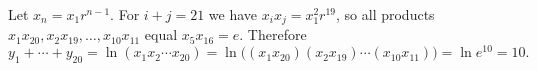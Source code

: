 Let $x_n=x_1r^{n-1}$. For $i+j=21$ we have $x_ix_j=x_1^2r^{19}$, so all products $x_1x_{20}, x_2x_{19},\dots,x_{10}x_{11}$ equal $x_5x_{16}=e$. Therefore
\[
y_1+\cdots+y_{20}=\ln(x_1x_2\cdots x_{20})=\ln\bigl((x_1x_{20})(x_2x_{19})\cdots(x_{10}x_{11})\bigr)=\ln e^{10}=\boxed{10}.
\]
